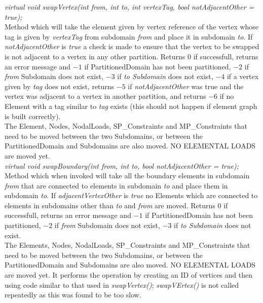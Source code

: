 {\em virtual void swapVertex(int from, int to, int vertexTag, bool
notAdjacentOther = true); } \\ 
Method which will take the element given by vertex reference of the
vertex whose tag is given by {\em vertexTag} from subdomain {\em from}
and place it in subdomain {\em to}. If {\em notAdjacentOther} is {\em
true} a check is made to ensure that the vertex to be swapped is not
adjacent to a vertex in any other partition. Returns $0$ if
successfull, returns an error message and $-1$ if PartitionedDomain
has not been partitioned, $-2$ if {\em from} Subdomain does not exist,
$-3$ if {\em to Subdomain} does not exist, $-4$ if a vertex given by
{\em tag} does not exist, returns $-5$ if {\em notAdjacentOther} was
true and the vertex was adjacent to a vertex in another partition, and
returns $-6$ if no Element with a tag similar to {\em tag} exists
(this should not happen if element graph is built correctly). \\
The Element, Nodes, NodalLoads, SP\_Constraints and MP\_Constraints
that need to be moved between the two Subdomains, or between the
PartitionedDomain and Subdomains are also moved. NO ELEMENTAL LOADS 
are moved yet. \\


{\em virtual void swapBoundary(int from, int to, bool notAdjacentOther
= true); } \\ 
Method which when invoked will take all the boundary elements in
subdomain {\em from} that are connected to elements in subdomain {\em
to} and place them in subdomain {\em to}. If {\em adjacentVertexOther} is
{\em true} no Elements which are connected to elements in subdomains other 
than {\em to} and {\em from} are moved. Returns $0$ if successfull, returns 
an error message and $-1$ if PartitionedDomain has not been partitioned, $-2$ 
if {\em from} Subdomain does not exist, $-3$ if {\em to Subdomain}
does not exist. \\ The Elements, Nodes, NodalLoads, SP\_Constraints
and MP\_Constraints that need to be moved between the two Subdomains,
or between the PartitionedDomain and Subdomains are also moved. NO
ELEMENTAL LOADS are moved yet. It performs the operation by creating
an ID of vertices and then using code similar to that used in {\em
swapVertex()}; {\em swapVErtex()} is not called repeatedly as this was
found to be too slow. \\ 

